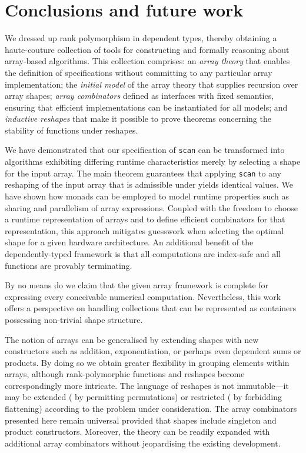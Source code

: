 \section{\label{sec:concl}Conclusions and future work}

We dressed up rank polymorphism in dependent types, thereby obtaining a
haute-couture collection of tools for constructing and formally reasoning about
array-based algorithms.  This collection comprises: an \emph{array theory} that
enables the definition of specifications without committing to any particular
array implementation; the \emph{initial model} of the array theory that supplies
recursion over array shapes; \emph{array combinators} defined as interfaces
with fixed semantics, ensuring that efficient implementations can be
instantiated for all models; and \emph{inductive reshapes} that make it
possible to prove theorems concerning the stability of functions
under reshapes.

We have demonstrated that our specification of \texttt{scan} can be transformed
into algorithms exhibiting differing runtime characteristics merely by
selecting a shape for the input array.  The main theorem guarantees that
applying \texttt{scan} to any reshaping of the input array that is admissible under
 yields identical values.  We have shown how monads can be employed
to model runtime properties such as sharing and parallelism of array
expressions.  Coupled with the freedom to choose a runtime representation of
arrays and to define efficient combinators for that representation, this
approach mitigates guesswork when selecting the optimal shape for a given
hardware architecture.  An additional benefit of the dependently-typed
framework is that all computations are index-safe and all functions are
provably terminating.

By no means do we claim that the given array framework is complete for expressing
every conceivable numerical computation.  Nevertheless, this work offers a
perspective on handling collections that can be represented as containers
possessing non-trivial shape structure.

The notion of arrays can be generalised by extending shapes with new
constructors such as addition, exponentiation, or perhaps even dependent sums
or products. By doing so we obtain greater flexibility in grouping elements
within arrays, although rank-polymorphic functions and reshapes become
correspondingly more intricate. The language of reshapes is not immutable---it
may be extended (\eg{} by permitting permutations) or restricted (\eg{} by
forbidding flattening) according to the problem under consideration. The array
combinators presented here remain universal provided that shapes include
singleton and product constructors. Moreover, the theory can be readily
expanded with additional array combinators without jeopardising the existing
development.

